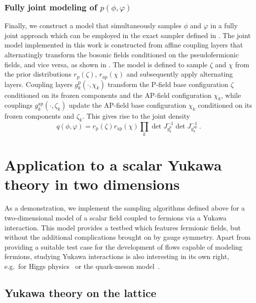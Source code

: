 \documentclass[aps,prd,twocolumn,nofootinbib,superscriptaddress,preprintnumbers]{revtex4-1}
\begin{document}
\subsubsection{Fully joint modeling of \texorpdfstring{$p(\phi,\varphi)$}{p(phi,varphi)}}
\label{sec:joint-modeling}

Finally, we construct a model that simultaneously samples $\phi$ and $\varphi$ in a fully joint approach which can be employed in the exact sampler defined in . The joint model implemented in this work is constructed from affine coupling layers that alternatingly transform the bosonic fields conditioned on the pseudofermionic fields, and vice versa, as shown in . The model is defined to sample $\zeta$ and $\chi$ from the prior distributions $r_{\mathrm{p}}(\zeta)$, $r_{\mathrm{ap}}(\chi)$ and subsequently apply alternating layers. Coupling layers $g^{\mathrm{p}}_{k}(\cdot, \chi_k)$ transform the P-field base configuration $\zeta$ conditioned on its frozen components and the AP-field configuration $\chi_k$, while couplings $g^{\mathrm{ap}}_{k}(\cdot, \zeta_k)$ update the AP-field base configuration $\chi_k$ conditioned on its frozen components and $\zeta_k$. This gives rise to the joint density
%
\begin{equation}
    q(\phi, \varphi) = r_{\mathrm{p}}(\zeta) r_{\mathrm{ap}}(\chi) \prod_k \det J_{g^{\mathrm{p}}_k}^{-1} \det J_{g^{\mathrm{ap}}_k}^{-1}\ .
\end{equation}


\section{Application to a scalar Yukawa theory in two dimensions}
\label{sec:results}

As a demonstration, we implement the sampling algorithms defined above for a two-dimensional model of a scalar field coupled to fermions via a Yukawa interaction. This model provides a testbed which features fermionic fields, but without the additional complications brought on by gauge symmetry. Apart from providing a suitable test case for the development of flows capable of modeling fermions, studying Yukawa interactions is also interesting in its own right, e.g.~for Higgs physics~\cite{Witzel:2019jbe} or the quark-meson model~\cite{Wambach:2009ee}.


\subsection{Yukawa theory on the lattice}
\label{sec:yukawa-theory}
\end{document}
